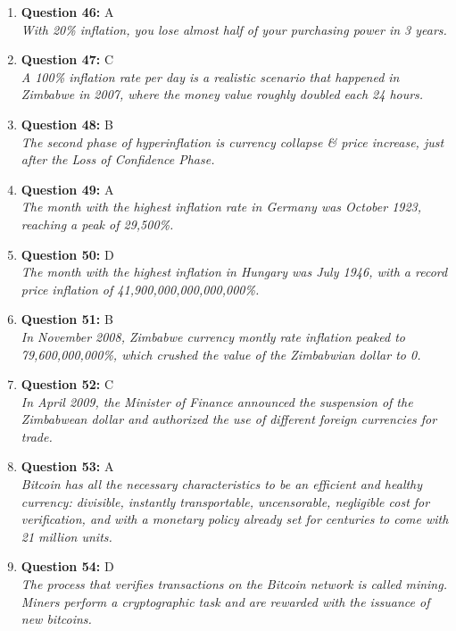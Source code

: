 \documentclass[12pt,a4paper]{article}
\begin{document}
\begin{enumerate}
\item \textbf{Question 46:} A
\\ \textit{With 20\% inflation, you lose almost half of your purchasing power in 3 years.}

\item \textbf{Question 47:} C
\\ \textit{A 100\% inflation rate per day is a realistic scenario that happened in Zimbabwe in 2007, where the money value roughly doubled each 24 hours.}

\item \textbf{Question 48:} B
\\ \textit{The second phase of hyperinflation is currency collapse & price increase, just after the Loss of Confidence Phase.}

\item \textbf{Question 49:} A
\\ \textit{The month with the highest inflation rate in Germany was October 1923, reaching a peak of 29,500\%.}

\item \textbf{Question 50:} D
\\ \textit{The month with the highest inflation in Hungary was July 1946, with a record price inflation of 41,900,000,000,000,000\%.}

\item \textbf{Question 51:} B
\\ \textit{In November 2008, Zimbabwe currency montly rate inflation peaked to 79,600,000,000\%, which crushed the value of the Zimbabwian dollar to 0.}

\item \textbf{Question 52:} C
\\ \textit{In April 2009, the Minister of Finance announced the suspension of the Zimbabwean dollar and authorized the use of different foreign currencies for trade.}

\item \textbf{Question 53:} A
\\ \textit{Bitcoin has all the necessary characteristics to be an efficient and healthy currency: divisible, instantly transportable, uncensorable, negligible cost for verification, and with a monetary policy already set for centuries to come with 21 million units.}

\item \textbf{Question 54:} D
\\ \textit{The process that verifies transactions on the Bitcoin network is called mining. Miners perform a cryptographic task and are rewarded with the issuance of new bitcoins.}


\end{enumerate}
\end{document}
